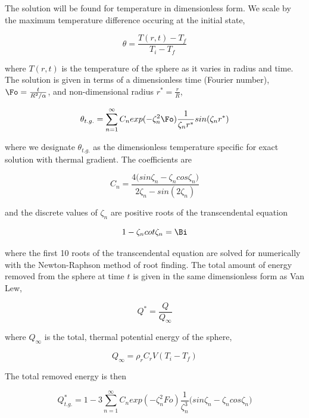 The solution will be found for temperature in dimensionless form. We scale by the maximum temperature difference occuring at the initial state,

\begin{equation}
	\theta=\frac{T(r,t)-T_{f}}{T_{i}-T_{f}}
\end{equation}

where $T(r,t)$ is the temperature of the sphere as it varies in radius and time. The solution is given in terms of a dimensionless time (Fourier number), $\Fo = \frac{t}{R^2/\alpha}$, and non-dimensional radius $r^* = \frac{r}{R}$,

\begin{equation}
	\theta_{t.g.}=\sum_{n=1}^\infty C_n exp(-\zeta_n^2 \Fo)\frac{1}{\zeta_nr^*} sin(\zeta_n r^*)
\end{equation}

where we designate $\theta_{t.g.}$ as the dimensionless temperature specific for exact solution with thermal gradient. The coefficients are

\begin{equation}
	C_n=\frac{4\big(sin\zeta_n -\zeta_n cos\zeta_n\big)}{2\zeta_n-sin(2\zeta_n)}
\end{equation}

and the discrete values of $\zeta_n$ are positive roots of the transcendental equation

\begin{equation}\label{eq:traneqn}
	1-\zeta_ncot\zeta_n = \Bi
\end{equation}

where the first 10 roots of the transcendental equation are solved for numerically with the Newton-Raphson method of root finding. The total amount of energy removed from the sphere at time $t$ is given in the same dimensionless form as Van Lew\cite{VanLew2010}, 

\begin{equation}
	Q^*=\frac{Q}{Q_{\infty}}
\end{equation}

where $Q_{\infty}$ is the total, thermal potential energy of the sphere,

\begin{equation}
	Q_{\infty}=\rho_rC_rV(T_{i}-T_{f})
\end{equation}

The total removed energy is then

\begin{equation}
\label{eq:qexact}
	Q^*_{t.g.}=1-3\sum_{n=1}^\infty C_n exp(-\zeta_n^2 Fo)\frac{1}{\zeta_n^3} \big(sin\zeta_n-\zeta_ncos\zeta_n\big)
\end{equation}

